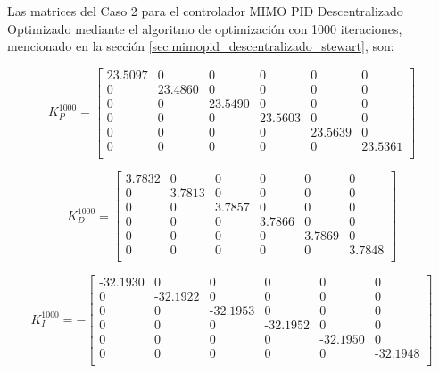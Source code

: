 Las matrices del Caso 2 para el controlador MIMO PID Descentralizado Optimizado mediante el algoritmo de optimización con 1000 iteraciones, mencionado en la sección \ref{sec:mimopid_descentralizado_stewart}, son:

\begin{equation}
    K_P^{1000} = \begin{bmatrix}
        23.5097 &	0 &	0 &	0 &	0 &	0 \\
        0 &	23.4860 &	0 &	0 &	0 &	0 \\
        0 &	0 &	23.5490 &	0 &	0 &	0 \\
        0 &	0 &	0 &	23.5603 &	0 &	0 \\
        0 &	0 &	0 &	0 &	23.5639 &	0 \\
        0 &	0 &	0 &	0 &	0 &	23.5361 \\
    \end{bmatrix}
\end{equation}

\begin{equation}
    K_D^{1000} = \begin{bmatrix}
        3.7832 &	0 &	0 &	0 &	0 &	0 \\
        0 &	3.7813 &	0 &	0 &	0 &	0 \\
        0 &	0 &	3.7857 &	0 &	0 &	0 \\
        0 &	0 &	0 &	3.7866 &	0 &	0 \\
        0 &	0 &	0 &	0 &	3.7869 &	0 \\
        0 &	0 &	0 &	0 &	0 &	3.7848 \\
    \end{bmatrix}
\end{equation}

\begin{equation}
    K_I^{1000} = -\begin{bmatrix}
        \textrm{-}32.1930 &	0 &	0 &	0 &	0 &	0 \\
        0 &	\textrm{-}32.1922 &	0 &	0 &	0 &	0 \\
        0 &	0 &	\textrm{-}32.1953 &	0 &	0 &	0 \\
        0 &	0 &	0 &	\textrm{-}32.1952 &	0 &	0 \\
        0 &	0 &	0 &	0 &	\textrm{-}32.1950 &	0 \\
        0 &	0 &	0 &	0 &	0 &	\textrm{-}32.1948 \\
    \end{bmatrix}
\end{equation}



